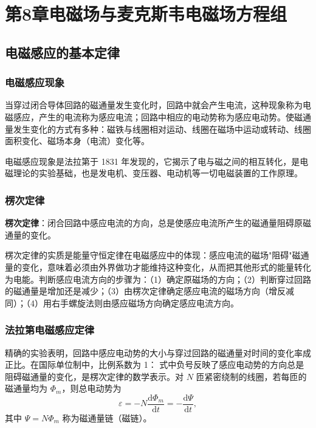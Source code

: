 \chapter{第8章\texorpdfstring{\hspace{0.5em}}{ }电磁场与麦克斯韦电磁场方程组}

\section{电磁感应的基本定律}
    \subsection{电磁感应现象}
    当穿过闭合导体回路的磁通量发生变化时，回路中就会产生电流，这种现象称为电磁感应，产生的电流称为感应电流；回路中相应的电动势称为感应电动势。使磁通量发生变化的方式有多种：磁铁与线圈相对运动、线圈在磁场中运动或转动、线圈面积变化、磁场本身（电流）变化等。

    电磁感应现象是法拉第于 1831 年发现的，它揭示了电与磁之间的相互转化，是电磁理论的实验基础，也是发电机、变压器、电动机等一切电磁装置的工作原理。

    \subsection{楞次定律}
    \textbf{楞次定律}：闭合回路中感应电流的方向，总是使感应电流所产生的磁通量阻碍原磁通量的变化。

    楞次定律的实质是能量守恒定律在电磁感应中的体现：感应电流的磁场"阻碍"磁通量的变化，意味着必须由外界做功才能维持这种变化，从而把其他形式的能量转化为电能。判断感应电流方向的步骤为：（1）确定原磁场的方向；（2）判断穿过回路的磁通量是增加还是减少；（3）由楞次定律确定感应电流的磁场方向（增反减同）；（4）用右手螺旋法则由感应磁场方向确定感应电流方向。

    \subsection{法拉第电磁感应定律}
    精确的实验表明，回路中感应电动势的大小与穿过回路的磁通量对时间的变化率成正比。在国际单位制中，比例系数为 1：
    式中负号反映了感应电动势的方向总是阻碍磁通量的变化，是楞次定律的数学表示。对 $N$ 匝紧密绕制的线圈，若每匝的磁通量均为 $\Phi_m$，则总电动势为
    \[
    \varepsilon=-N\frac{\mathrm{d}\Phi_m}{\mathrm{d}t}=-\frac{\mathrm{d}\Psi}{\mathrm{d}t},
    \]
    其中 $\Psi=N\Phi_m$ 称为磁通量链（磁链）。

